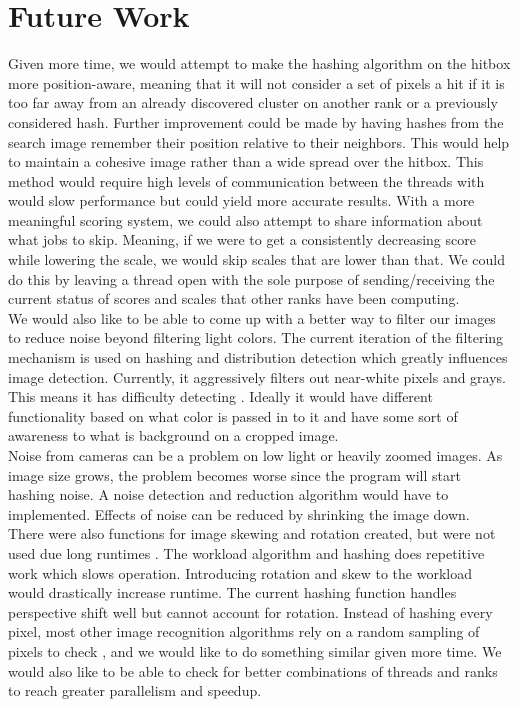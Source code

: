 \documentclass[10pt, journal]{vgtc}                %
\newcommand\tab[1][1cm]{\hspace*{#1}}
\begin{document}
\section{Future Work}
\begin{flushleft}
\tab Given more time, we would attempt to make the hashing algorithm on the hitbox more position-aware, meaning that it will not consider a set of pixels a hit if it is too far away from an already discovered cluster on another rank or a previously considered hash. Further improvement could be made by having hashes from the search image remember their position relative to their neighbors. This would help to maintain a cohesive image rather than a wide spread over the hitbox. This method would require high levels of communication between the threads with would slow performance but could yield more accurate results. With a more meaningful scoring system, we could also attempt to share information about what jobs to skip. Meaning, if we were to get a consistently decreasing score while lowering the scale, we would skip scales that are lower than that. We could do this by leaving a thread open with the sole purpose of sending/receiving the current status of scores and scales that other ranks have been computing. \\\smallskip
	\tab We would also like to be able to come up with a better way to filter our images to reduce noise beyond filtering light colors. The current iteration of the filtering mechanism is used on hashing and distribution detection which greatly influences image detection. Currently, it aggressively filters out near-white pixels and grays. This means it has difficulty detecting . Ideally it would have different functionality based on what color is passed in to it and have some sort of awareness to what is background on a cropped image.  \\\smallskip
	\tab Noise from cameras can be a problem on low light or heavily zoomed images. As image size grows, the problem becomes worse since the program will start hashing noise. A noise detection and reduction algorithm would have to implemented. Effects of noise can be reduced by shrinking the image down. \\\smallskip
	\tab There were also functions for image skewing and rotation created, but were not used due long runtimes \cite{Paeth:1990:FAG:90767.90811}. The workload algorithm and hashing does repetitive work which slows operation. Introducing rotation and skew to the workload would drastically increase runtime. The current hashing function handles perspective shift well but cannot account for rotation.
	Instead of hashing every pixel, most other image recognition algorithms rely on a random sampling of pixels to check \cite{7838673,1634363}, and we would like to do something similar given more time. We would also like to be able to check for better combinations of threads and ranks to reach greater parallelism and speedup. 
	
\end{flushleft}
\end{document}
